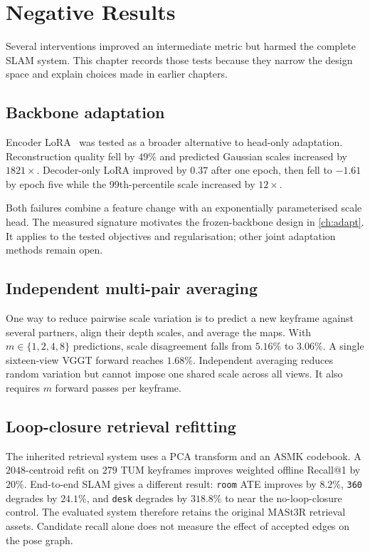 \chapter{Negative Results}
\label{ch:negative}

Several interventions improved an intermediate metric but harmed the complete
SLAM system. This chapter records those tests because they narrow the design
space and explain choices made in earlier chapters.

\section{Backbone adaptation}
\label{sec:neg:lora}

Encoder LoRA~\cite{hu2022lora} was tested as a broader alternative to
head-only adaptation. Reconstruction quality fell by $49\%$ and predicted
Gaussian scales increased by $1821\times$. Decoder-only LoRA improved by
$0.37$\dB{} after one epoch, then fell to $-1.61$\dB{} by epoch five while
the 99th-percentile scale increased by $12\times$.

Both failures combine a feature change with an exponentially parameterised
scale head. The measured signature motivates the frozen-backbone design in
\cref{ch:adapt}. It applies to the tested objectives and regularisation;
other joint adaptation methods remain open.

\section{Independent multi-pair averaging}
\label{sec:neg:aggregation}

One way to reduce pairwise scale variation is to predict a new keyframe
against several partners, align their depth scales, and average the maps.
With $m\in\{1,2,4,8\}$ predictions, scale disagreement falls from $5.16\%$
to $3.06\%$. A single sixteen-view VGGT forward reaches $1.68\%$.
Independent averaging reduces random variation but cannot impose one shared
scale across all views. It also requires $m$ forward passes per keyframe.

\section{Loop-closure retrieval refitting}
\label{sec:neg:retrieval}

The inherited retrieval system uses a PCA transform and an ASMK codebook.
A $2048$-centroid refit on $279$ TUM keyframes improves weighted offline
Recall@1 by $20\%$. End-to-end SLAM gives a different result:
\texttt{room} ATE improves by $8.2\%$, \texttt{360} degrades by $24.1\%$,
and \texttt{desk} degrades by $318.8\%$ to near the no-loop-closure control.
The evaluated system therefore retains the original MASt3R retrieval assets.
Candidate recall alone does not measure the effect of accepted edges on the
pose graph.

